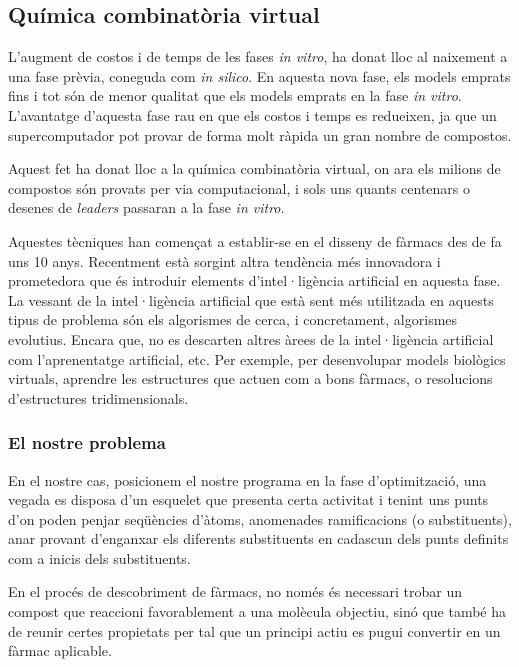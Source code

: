 	\subsection{Química combinatòria virtual}

	L'augment de costos i de temps de les fases \emph{in vitro}, ha donat lloc
	al naixement a una fase prèvia, coneguda com \emph{in silico}. En aquesta
	nova fase, els models emprats fins i tot són de menor qualitat que els models
	emprats en la fase \emph{in vitro}.  L'avantatge d'aquesta fase rau en que
	els costos i temps es redueixen, ja que un supercomputador pot provar de
	forma molt ràpida un gran nombre de compostos.

	Aquest fet ha donat lloc a la química combinatòria virtual, on ara els
	milions de compostos són provats per via computacional, i sols uns quants
	centenars o desenes de \emph{leaders} passaran a la fase \emph{in vitro}.

	Aquestes tècniques han començat a establir-se en el disseny de fàrmacs des
	de fa uns 10 anys. Recentment està sorgint altra tendència més innovadora i
	prometedora que és introduir elements d'intel·ligència artificial en aquesta
	fase. La vessant de la intel·ligència artificial que està sent més
	utilitzada en aquests tipus de problema són els algorismes de cerca, i
	concretament, algorismes evolutius. Encara que, no es descarten altres àrees
	de la intel·ligència artificial com l'aprenentatge artificial, etc.  Per
	exemple, per desenvolupar models biològics virtuals, aprendre les
	estructures que actuen com a bons fàrmacs, o resolucions d'estructures
	tridimensionals. 

\subsubsection{El nostre problema} %

	En el nostre cas, posicionem el nostre programa en la fase d'optimització,
	una vegada es disposa d'un esquelet que presenta certa activitat i tenint
	uns punts d'on poden penjar seqüències d'àtoms, anomenades ramificacions (o
	substituents), anar provant d'enganxar els diferents substituents en
	cadascun dels punts definits com a inicis dels substituents.

	En el procés de descobriment de fàrmacs, no només és
	necessari trobar un compost que reaccioni favorablement a una molècula
	objectiu, sinó que també ha de reunir certes propietats per tal que
	un principi actiu es pugui convertir en un fàrmac aplicable.  	

